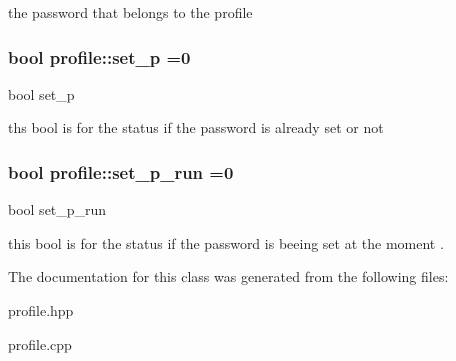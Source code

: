 the password that belongs to the profile 
\subsubsection[{\texorpdfstring{set\+\_\+p}{set_p}}]{\setlength{\rightskip}{0pt plus 5cm}bool profile\+::set\+\_\+p =0\hspace{0.3cm}{\ttfamily [protected]}}\hypertarget{classprofile_a82b3f6d034c00c6e180a3df4c46ce0f8}{}\label{classprofile_a82b3f6d034c00c6e180a3df4c46ce0f8}


bool set\+\_\+p 

ths bool is for the status if the password is already set or not 
\subsubsection[{\texorpdfstring{set\+\_\+p\+\_\+run}{set_p_run}}]{\setlength{\rightskip}{0pt plus 5cm}bool profile\+::set\+\_\+p\+\_\+run =0\hspace{0.3cm}{\ttfamily [protected]}}\hypertarget{classprofile_a0a35d68e263091faa4f4855f27ef3f38}{}\label{classprofile_a0a35d68e263091faa4f4855f27ef3f38}


bool set\+\_\+p\+\_\+run 

this bool is for the status if the password is beeing set at the moment . 

The documentation for this class was generated from the following files\+:\begin{DoxyCompactItemize}
\item 
profile.\+hpp\item 
profile.\+cpp\end{DoxyCompactItemize}
